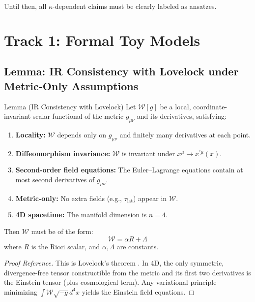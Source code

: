 \documentclass[11pt,titlepage]{article}
\begin{document}
Until then, all $\kappa$-dependent claims must be clearly labeled as ansatzes.


\section{Track 1: Formal Toy Models}


\subsection{Lemma: IR Consistency with Lovelock under Metric-Only Assumptions}
\label{lemma:lovelock-consistency}

\begin{mytheorem}{Lemma (IR Consistency with Lovelock)}
\label{lemma:lovelock}
Let $\mathcal{W}[g]$ be a local, coordinate-invariant scalar functional of the metric $g_{\mu\nu}$ and its derivatives, satisfying:
\begin{enumerate}[label=(L\arabic*)]
    \item \textbf{Locality:} $\mathcal{W}$ depends only on $g_{\mu\nu}$ and finitely many derivatives at each point.
    \item \textbf{Diffeomorphism invariance:} $\mathcal{W}$ is invariant under $x^\mu \to x^{\prime\mu}(x)$.
    \item \textbf{Second-order field equations:} The Euler--Lagrange equations contain at most second derivatives of $g_{\mu\nu}$.
    \item \textbf{Metric-only:} No extra fields (e.g., $\tau_{\mathrm{lat}}$) appear in $\mathcal{W}$.
    \item \textbf{4D spacetime:} The manifold dimension is $n=4$.
\end{enumerate}
Then $\mathcal{W}$ must be of the form:
\begin{equation}
\mathcal{W} = \alpha R + \Lambda
\end{equation}
where $R$ is the Ricci scalar, and $\alpha, \Lambda$ are constants.
\end{mytheorem}

\begin{proof}[Proof Reference]
This is Lovelock's theorem \cite{Lovelock1971}. In 4D, the only symmetric, divergence-free tensor constructible from the metric and its first two derivatives is the Einstein tensor (plus cosmological term). Any variational principle minimizing $\int \mathcal{W} \sqrt{-g} d^4x$ yields the Einstein field equations.
\end{proof}
\end{document}
